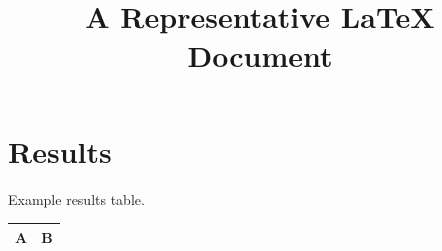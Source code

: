 \documentclass{article}
\title{A Representative LaTeX Document}
\begin{document}
\maketitle\section{Results}Example results table.\begin{tabular}{ll}\toprule A&B\\\bottomrule\end{tabular}
\end{document}
